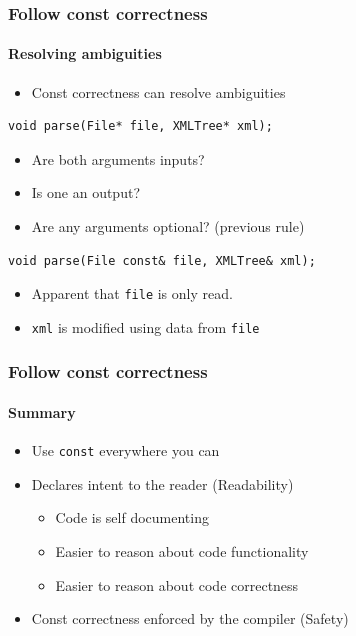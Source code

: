 \documentclass[table]{beamer}
\newcounter{rulecount}
\newcommand{\declarerule}{\textbf{\color{themeblue}{Rule \therulecount:}} }
\begin{document}
\begin{frame}[fragile]
    \frametitle{\declarerule Follow const correctness}
    \framesubtitle{Resolving ambiguities}
    \begin{itemize}
        \item Const correctness can resolve ambiguities
    \end{itemize}
    \begin{lstlisting}[title=Ambiguous declaration without const]
void parse(File* file, XMLTree* xml);
    \end{lstlisting}
    \begin{itemize}
        \item Are both arguments inputs?
        \item Is one an output?
        \item Are any arguments optional? (previous rule)
    \end{itemize}
    \begin{lstlisting}[title=Const correct]
void parse(File const& file, XMLTree& xml);
    \end{lstlisting}
    \begin{itemize}
        \item Apparent that \texttt{file} is only read.
        \item \texttt{xml} is modified using data from \texttt{file}
    \end{itemize}
\end{frame}

\begin{frame}[fragile]
    \frametitle{\declarerule Follow const correctness}
    \framesubtitle{Summary}
    \begin{itemize}
        \item Use \texttt{const} everywhere you can
        \item Declares intent to the reader (\alert{Readability})
            \begin{itemize}
                \item Code is self documenting
                \item Easier to reason about code functionality
                \item Easier to reason about code correctness
            \end{itemize}
        \item Const correctness enforced by the compiler (\alert{Safety})
    \end{itemize}
\end{frame}
\end{document}
